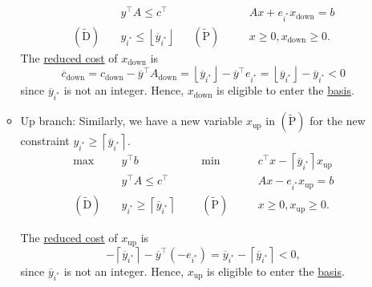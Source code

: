 \begin{remark}
\begin{itemize}
\begin{itemize}
\[\begin{alignedat}{5}
					      &y^{\top}A\leq c^{\top} 				&&		&&Ax + e_{i^{\ast}}x_{\text{down}} = b\\
					      (\widetilde{\mathrm{D}})\quad& y_{i^{\ast}}\leq \left\lfloor \overline{y}_{i^{\ast}} \right\rfloor	&&(\widetilde{\mathrm{P}})\quad&&x\geq 0, x_{\text{down}}\geq 0.
				      \end{alignedat}
			      \]
			      The \hyperref[def:reduced-cost]{reduced cost} of \(x_{\text{down}}\) is
			      \[
				      \overline{c}_{\text{down}}=c_{\text{down}}-\overline{y}^{\top}A_{\text{down}} = \left\lfloor \overline{y}_{i^{\ast}} \right\rfloor - \overline{y}^{\top}e_{i^{\ast}} = \left\lfloor \overline{y}_{i^{\ast}} \right\rfloor - \overline{y}_{i^{\ast}} < 0
			      \]
			      since \(\overline{y} _{i^{\ast} }\) is not an integer. Hence, \(x_{\text{down}}\) is eligible to enter the \hyperref[def:basis]{basis}.
			      \item\label{rmk:up-branch} Up branch: Similarly, we have a new variable \(x_{\text{up}}\) in \((\widetilde{\mathrm{P}})\) for the new constraint \(y_{i^{\ast}} \geq \left\lceil \overline{y} _{i^{\ast}} \right\rceil \).
			      \[
				      \begin{alignedat}{5}
					      \max ~	&y^{\top}b\qquad\qquad				&&\min~	&& c^{\top}x - \left\lceil \overline{y}_{i^{\ast}} \right\rceil x_{\text{up}}\\
					      &y^{\top}A\leq c^{\top} 				&&		&&Ax - e_{i^{\ast}} x_{\text{up}}= b                                      \\
					      (\widetilde{\mathrm{D}})\quad& y_{i^{\ast}} \geq \left\lceil \overline{y} _{i^{\ast}} \right\rceil	&&(\widetilde{\mathrm{P}})\quad&&x\geq 0, x_{\text{up}}\geq 0.
				      \end{alignedat}
			      \]

			      The \hyperref[def:reduced-cost]{reduced cost} of \(x_{\text{up}}\) is
			      \[
				      -\left\lceil \overline{y}_{i^{\ast}} \right\rceil - \overline{y}^{\top}(-e_{i^{\ast}}) = \overline{y}_{i^{\ast}} - \left\lceil \overline{y}_{i^{\ast}} \right\rceil < 0,
			      \]
			      since \(\overline{y} _{i^{\ast} }\) is not an integer. Hence, \(x_{\text{up}}\) is eligible to enter the \hyperref[def:basis]{basis}.
		      \end{itemize}
	\end{itemize}
\end{remark}


